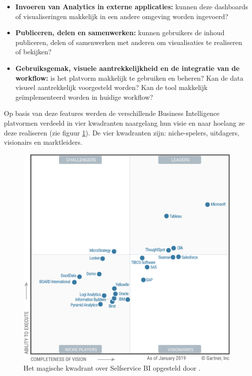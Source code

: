 \begin{itemize}
	\item \textbf{Invoeren van Analytics in externe applicaties:} kunnen deze dashboards of visualiseringen makkelijk in een andere omgeving worden ingevoerd?
	\item \textbf{Publiceren, delen en samenwerken: } kunnen gebruikers de inhoud publiceren, delen of samenwerken met anderen om visualisaties te realiseren of bekijken?
	\item \textbf{Gebruiksgemak, visuele aantrekkelijkheid en de integratie van de workflow:} is het platvorm makkelijk te gebruiken en beheren? Kan de data visueel aantrekkelijk voorgesteld worden? Kan de tool makkelijk geïmplementeerd worden in huidige workflow?
\end{itemize} 
\newpage
Op basis van deze features werden de verschillende Business Intelligence platvormen verdeeld in vier kwadranten naargelang hun visie en naar hoelang ze deze realiseren (zie figuur \ref{fig:dvmode}). De vier kwadranten zijn: niche-spelers, uitdagers, visionairs en marktleiders.

\begin{figure}[H]
	\centering
	\includegraphics[scale=0.7]{../images/gartner.png}
	\caption{Het magische kwadrant over Selfservice BI opgesteld door \textcite{Gartner2019}.}
	\label{fig:dvmode}
\end{figure}

